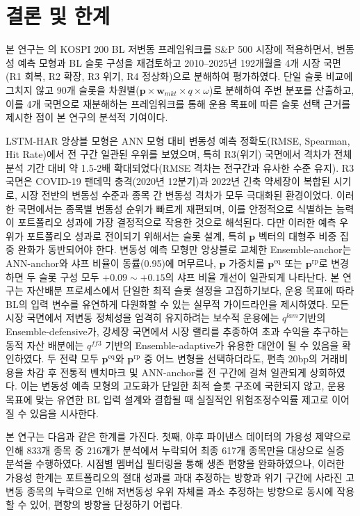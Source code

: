 \documentclass[eng]{kjas3}
\begin{document}
\section{결론 및 한계}\label{sec:conclusion}

본 연구는 \citet{pyo2018}의 KOSPI 200 BL 저변동 프레임워크를 S\&P 500 시장에 적용하면서, 변동성 예측 모형과 BL 슬롯 구성을 재검토하고 2010--2025년 192개월을 4개 시장 국면(R1 회복, R2 확장, R3 위기, R4 정상화)으로 분해하여 평가하였다. 단일 슬롯 비교에 그치지 않고 90개 슬롯을 차원별($\mathbf{p} \times \mathbf{w}_{mkt} \times q \times \omega$)로 분해하여 주변 분포를 산출하고, 이를 4개 국면으로 재분해하는 프레임워크를 통해 운용 목표에 따른 슬롯 선택 근거를 제시한 점이 본 연구의 분석적 기여이다.

LSTM-HAR 앙상블 모형은 ANN 모형 대비 변동성 예측 정확도(RMSE, Spearman, Hit Rate)에서 전 구간 일관된 우위를 보였으며, 특히 R3(위기) 국면에서 격차가 전체 분석 기간 대비 약 1.5-2배 확대되었다(RMSE 격차는 전구간과 유사한 수준 유지). R3 국면은 COVID-19 팬데믹 충격(2020년 1\textendash 2분기)과 2022년 긴축 약세장이 복합된 시기로, 시장 전반의 변동성 수준과 종목 간 변동성 격차가 모두 극대화된 환경이었다. 이러한 국면에서는 종목별 변동성 순위가 빠르게 재편되며, 이를 안정적으로 식별하는 능력이 포트폴리오 성과에 가장 결정적으로 작용한 것으로 해석된다. 다만 이러한 예측 우위가 포트폴리오 성과로 전이되기 위해서는 슬롯 설계, 특히 $\mathbf{p}$ 벡터의 대형주 비중 집중 완화가 동반되어야 한다. 변동성 예측 모형만 앙상블로 교체한 Ensemble-anchor는 ANN-anchor와 샤프 비율이 동률(0.95)에 머무르나, $\mathbf{p}$ 가중치를 $\mathbf{p}^{\mathrm{eq}}$ 또는 $\mathbf{p}^{\mathrm{rp}}$로 변경하면 두 슬롯 구성 모두 $+0.09 \sim +0.15$의 샤프 비율 개선이 일관되게 나타난다.
본 연구는 자산배분 프로세스에서 단일한 최적 슬롯 설정을 고집하기보다, 운용 목표에 따라 BL의 입력 변수를 유연하게 다원화할 수 있는 실무적 가이드라인을 제시하였다. 모든 시장 국면에서 저변동 정체성을 엄격히 유지하려는 보수적 운용에는 $q^{lam}$‬기반의 Ensemble-defensive가, 강세장 국면에서 시장 랠리를 추종하여 초과 수익을 추구하는 동적 자산 배분에는 $q^{ff3}$‬ 기반의 Ensemble-adaptive가 유용한 대안이 될 수 있음을 확인하였다. 두 전략 모두 $\mathbf{p}^{\mathrm{eq}}$와 $\mathbf{p}^{\mathrm{rp}}$‬ 중 어느 변형을 선택하더라도, 편측 20bp의 거래비용을 차감 후 전통적 벤치마크 및 ANN-anchor를 전 구간에 걸쳐 일관되게 상회하였다. 이는 변동성 예측 모형의 고도화가 단일한 최적 슬롯 구조에 국한되지 않고, 운용 목표에 맞는 유연한 BL 입력 설계와 결합될 때 실질적인 위험조정수익률 제고로 이어질 수 있음을 시사한다.

본 연구는 다음과 같은 한계를 가진다. 첫째, 야후 파이낸스 데이터의 가용성 제약으로 인해 833개 종목 중 216개가 분석에서 누락되어 최종 617개 종목만을 대상으로 실증 분석을 수행하였다. 시점별 멤버십 필터링을 통해 생존 편향을 완화하였으나, 이러한 가용성 한계는 포트폴리오의 절대 성과를 과대 추정하는 방향과 위기 구간에 사라진 고변동 종목의 누락으로 인해 저변동성 우위 자체를 과소 추정하는 방향으로 동시에 작용할 수 있어, 편향의 방향을 단정하기 어렵다.
\end{document}
